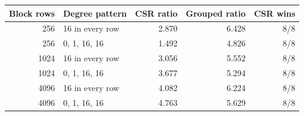 \begin{tabular}{rlrrr}
\toprule
Block rows & Degree pattern & CSR ratio & Grouped ratio & CSR wins \\
\midrule
256 & 16 in every row & 2.870 & 6.428 & 8/8 \\
256 & 0, 1, 16, 16 & 1.492 & 4.826 & 8/8 \\
1024 & 16 in every row & 3.056 & 5.552 & 8/8 \\
1024 & 0, 1, 16, 16 & 3.677 & 5.294 & 8/8 \\
4096 & 16 in every row & 4.082 & 6.224 & 8/8 \\
4096 & 0, 1, 16, 16 & 4.763 & 5.629 & 8/8 \\
\bottomrule
\end{tabular}
